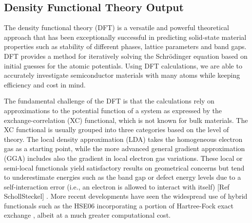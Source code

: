 \documentclass[superscriptaddress,unsortedaddress,
 amsmath,amssymb,
 aps,
]{revtex4-2}
\begin{document}
\subsection*{Density Functional Theory Output} %
The density functional theory (DFT) is a versatile and powerful theoretical approach that has been exceptionally successful in predicting solid-state material properties such as stability of different phases, lattice parameters and band gaps. 
DFT provides a method for iteratively solving the Schr{\"o}dinger equation based on initial guesses for the atomic potentials. 
Using DFT calculations, we are able to accurately investigate semiconductor materials with many atoms while keeping efficiency and cost in mind.  


The fundamental challenge of the DFT is that the calculations rely on approximations to the potential function of a system as expressed by the exchange-correlation (XC) functional, which is not known for bulk materials. 
The XC functional is usually grouped into three categories based on the level of theory. The local density approximation (LDA) takes the homogeneous electron gas as a starting point, while the more advanced general gradient approximation (GGA) includes also the gradient in local electron gas variations. 
These local or semi-local functionals yield satisfactory results on geometrical concerns but tend to underestimate energies such as the band gap or defect energy levels due to a self-interaction error (i.e., an electron is allowed to interact with itself) [Ref SchollSteckel] \cite{Freysoldt2014}. 
More recent developments have seen the widespread use of hybrid functionals such as the HSE06 incorporating a portion of Hartree-Fock exact exchange \cite{Heyd2003},  albeit at a much greater computational cost. 
\end{document}
